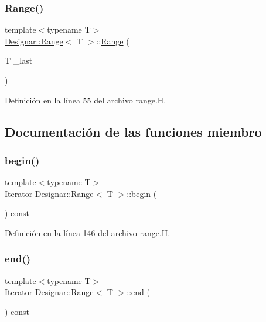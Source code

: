 \subsubsection{\texorpdfstring{Range()}{Range()}\hspace{0.1cm}{\footnotesize\ttfamily [2/2]}}
{\footnotesize\ttfamily template$<$typename T$>$ \\
\hyperlink{class_designar_1_1_range}{Designar\+::\+Range}$<$ T $>$\+::\hyperlink{class_designar_1_1_range}{Range} (\begin{DoxyParamCaption}\item[{T}]{\+\_\+last }\end{DoxyParamCaption})\hspace{0.3cm}{\ttfamily [inline]}}



Definición en la línea 55 del archivo range.\+H.



\subsection{Documentación de las funciones miembro}
\mbox{\label{class_designar_1_1_range_af26fe1974236b1a3ff61992986349b5f}} 
\subsubsection{\texorpdfstring{begin()}{begin()}}
{\footnotesize\ttfamily template$<$typename T$>$ \\
\hyperlink{class_designar_1_1_range_1_1_iterator}{Iterator} \hyperlink{class_designar_1_1_range}{Designar\+::\+Range}$<$ T $>$\+::begin (\begin{DoxyParamCaption}{ }\end{DoxyParamCaption}) const\hspace{0.3cm}{\ttfamily [inline]}}



Definición en la línea 146 del archivo range.\+H.

\mbox{\label{class_designar_1_1_range_ab764bbefe3e28a17886e1093371d0e50}} 
\subsubsection{\texorpdfstring{end()}{end()}}
{\footnotesize\ttfamily template$<$typename T$>$ \\
\hyperlink{class_designar_1_1_range_1_1_iterator}{Iterator} \hyperlink{class_designar_1_1_range}{Designar\+::\+Range}$<$ T $>$\+::end (\begin{DoxyParamCaption}{ }\end{DoxyParamCaption}) const\hspace{0.3cm}{\ttfamily [inline]}}



